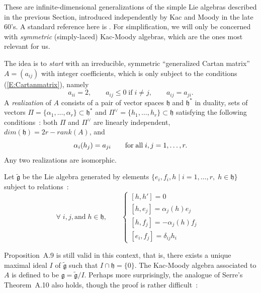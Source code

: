 \documentclass[a4paper,10pt]{amsart}
\def\a{\alpha}
\def\g{\mathfrak{g}}
\def\h{\mathfrak{h}}
\numberwithin{equation}{section}
\begin{document}
{\vspace{.15in}

These are infinite-dimensional generalizations of the simple Lie algebras described in the previous Section, introduced independently by Kac and Moody in the late 60's. A standard reference here is \cite{Kac}. For simplification, we will only be concerned with \textit{symmetric} (simply-laced) Kac-Moody algebras, which are the ones most relevant for us.

\vspace{.1in}

The idea is to \textit{start} with an irreducible, symmetric ``generalized Cartan matrix'' $A=(a_{ij})$ with integer coefficients, which is only subject to the conditions (\ref{E:Cartanmatrix}), namely
$$a_{ii}=2, \qquad a_{ij} \leq 0\; \text{if}\; i \neq j, \qquad a_{ij}=a_{ji}.$$
A \textit{realization} of $A$ consists of a pair of vector spaces $\h$ and $\h^*$ in duality, sets of vectors
$\Pi=\{\a_1, \ldots, \a_r\} \subset \h^*$ and $\Pi^\vee=\{h_1, \ldots, h_r\} \subset \h$ satisfying the following conditions~: both $\Pi$ and $\Pi^\vee$ are linearly independent, ${dim}(\h)=2r-{rank}(A)$, and
$$\alpha_i(h_j)=a_{ji}\qquad \text{for\;all\;} i,j=1, \ldots, r.$$
Any two realizations are isomorphic.

\vspace{.1in}

Let $\widetilde{\g}$ be the Lie algebra generated by elements $\{e_i,f_i, h\;|\; i=1, \ldots ,r, \; h \in \h\}$ subject to relations~:
\begin{equation}\label{E:slarelations2}
\forall\; i,j, \text{and}\; h \in \h, \qquad
\begin{cases}
[h,h']=0 & \\
[h, e_j]=\a_j(h) e_j & \\
[h, f_j]=-\a_{j}(h) f_j &\\
[e_i,f_j]= \delta_{ij} h_i
\end{cases}
\end{equation}

\vspace{.1in}

Proposition~A.9 is still valid in this context, that is, there exists a unique maximal ideal $I$ of $\widetilde{\g}$ such that $I \cap \h=\{0\}$. The Kac-Moody algebra associated to $A$ is defined to be $\g=\widetilde{\g}/I$. Perhaps more surprisingly, the analogue of Serre's Theorem~A.10 also holds, though the proof is rather difficult~:

\vspace{.1in}

}
\end{document}
